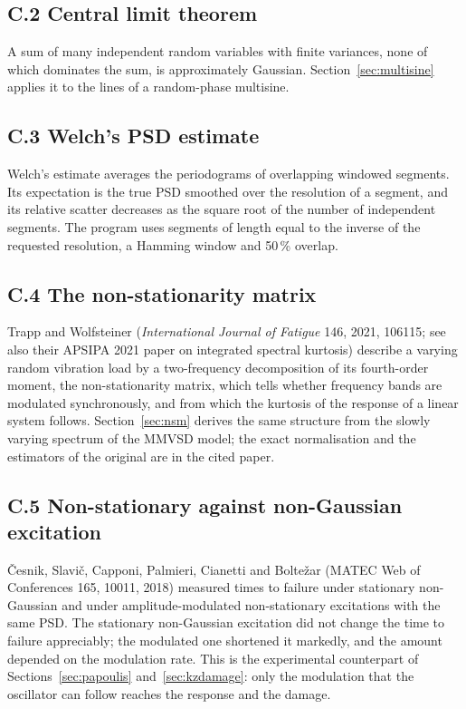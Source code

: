 \subsection*{C.2 Central limit theorem}

A sum of many independent random variables with finite variances, none of which dominates the sum,
is approximately Gaussian. Section~\ref{sec:multisine} applies it to the lines of a random-phase
multisine.

\subsection*{C.3 Welch's PSD estimate}

Welch's estimate averages the periodograms of overlapping windowed segments. Its expectation is the
true PSD smoothed over the resolution of a segment, and its relative scatter decreases as the square
root of the number of independent segments. The program uses segments of length equal to the inverse of
the requested resolution, a Hamming window and 50\,\% overlap.

\subsection*{C.4 The non-stationarity matrix}

Trapp and Wolfsteiner (\emph{International Journal of Fatigue} 146, 2021, 106115; see also their APSIPA
2021 paper on integrated spectral kurtosis) describe a varying random vibration load by a two-frequency
decomposition of its fourth-order moment, the non-stationarity matrix, which tells whether frequency
bands are modulated synchronously, and from which the kurtosis of the response of a linear system
follows. Section~\ref{sec:nsm} derives the same structure from the slowly varying spectrum of the MMVSD
model; the exact normalisation and the estimators of the original are in the cited paper.

\subsection*{C.5 Non-stationary against non-Gaussian excitation}

{\v C}esnik, Slavi{\v c}, Capponi, Palmieri, Cianetti and Bolte{\v z}ar (MATEC Web of Conferences 165,
10011, 2018) measured times to failure under stationary non-Gaussian and under amplitude-modulated
non-stationary excitations with the same PSD. The stationary non-Gaussian excitation did not change the
time to failure appreciably; the modulated one shortened it markedly, and the amount depended on the
modulation rate. This is the experimental counterpart of Sections~\ref{sec:papoulis} and~\ref{sec:kzdamage}:
only the modulation that the oscillator can follow reaches the response and the damage.
